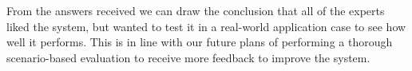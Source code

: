 From the answers received we can draw the conclusion that all of the experts liked the system, but wanted to test it in a real-world application case to see how well it performs. This is in line with our future plans of performing a thorough scenario-based evaluation to receive more feedback to improve the system.